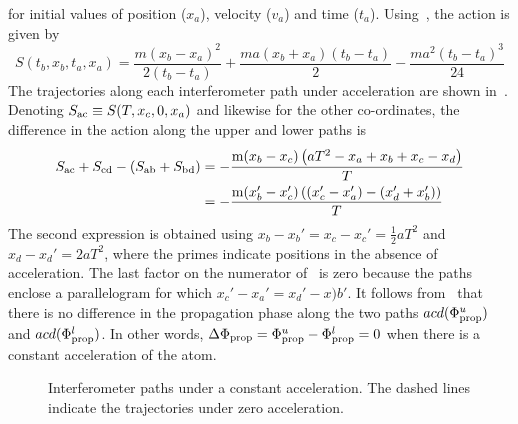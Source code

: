 for initial values of position ($x_a$), velocity ($v_a$) and time
($t_a$).     
Using~, the action is given by 
\begin{equation}
  \label{eq:action_classical}
  S(t_b,x_b,t_a,x_a) = \frac{m(x_b-x_a)^2}{2(t_b-t_a)} + \frac{m a
  (x_b+x_a)(t_b-t_a)}{2} -\frac{m a^2 (t_b-t_a)^3}{24} 
\end{equation}
The trajectories along each interferometer path under acceleration are
shown in~. Denoting
$S_\textnormal{ac} \equiv S(T,x_c,0,x_a)$ and likewise for the other
co-ordinates, the difference in the action along the upper and lower paths is 
\begin{align}
  S_\textnormal{ac} + S_\textnormal{cd} -
\left(S_\textnormal{ab}+S_\textnormal{bd}\right) &= -\frac{\text{m}
(x_b-x_c) \left(a T^2- x_a+x_b+x_c-x_d\right)}{T}\nonumber \\
&= -\frac{\text{m}
(x'_b-x'_c) \left((x'_c-x'_a) - (x'_d+x'_b)\right)}{T}
\label{eq:prop_action}
\end{align}
The second expression is obtained using $x_b - x_b' = x_c - x_c'
= \frac{1}{2}a T^2$ and $x_d-x_d' = 2 a T^2$, where the primes
indicate positions in the absence of acceleration. The last factor on
the numerator of~ is zero because the
paths enclose a parallelogram for which $x_c' - x_a' = x_d'-x)b'$. It follows
from~ that there is no difference in the
propagation phase along the two paths $acd
(\Phi_\textnormal{prop}^{u})$ and $acd (\Phi_\textnormal{prop}^{l})$. In other words,
$\Delta\Phi_\textnormal{prop} = \Phi_\textnormal{prop}^{u}-
\Phi_\textnormal{prop}^{l}=
0$ when there is a constant acceleration of the atom.
\begin{figure}[htpb]
  \centering
  \resizebox{0.8\textwidth}{!}{}
  \caption[Interferemeter paths under constant
  acceleration]{Interferometer paths under a constant acceleration.
  The dashed lines indicate the trajectories under zero acceleration.}
\label{fig:interferometer_accel}
\end{figure}
